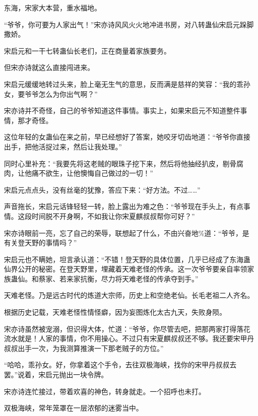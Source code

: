 
\begin{this_body}



东海，宋家大本营，重水福地。

“爷爷，你可要为人家出气！”宋亦诗风风火火地冲进书房，对八转蛊仙宋启元跺脚撒娇。

宋启元和一干七转蛊仙长老们，正在商量着家族要务。

但宋亦诗就这么直接闯进来。

宋启元缓缓地转过头来，脸上毫无生气的意思，反而满是慈祥的笑容：“我的乖孙女，要爷爷怎么为你出气啊？”

宋亦诗并不奇怪，自己的爷爷知道这件事情。事实上，如果宋启元不知道整件事情，那才奇怪。

这位年轻的女蛊仙在来之前，早已经想好了答案，她咬牙切齿地道：“爷爷你直接出手，把他活捉过来，然后让我处理。”

同时心里补充：“我要先将这老贼的眼珠子挖下来，然后将他抽经扒皮，剔骨腐肉，让他痛不欲生，让他懊悔自己做过的一切！”

宋启元点点头，没有丝毫的犹豫，答应下来：“好方法。不过……”

声音拖长，宋启元话锋轻轻一转，脸上露出为难之色：“爷爷现在手头上，有点事情。这段时间脱不开身啊，不如我让你宋夏麒叔叔帮你可好？”

宋亦诗眼前一亮，忘了自己的荣辱，联想起了什么，不由兴奋地\%道：“爷爷，是有关登天野的事情吗？”

宋启元也不瞒她，坦言承认道：“不错！登天野的具体位置，几乎已经成了东海蛊仙界公开的秘密。在登天野里，埋藏着天难老怪的传承。这一次爷爷要亲自率领家族蛊仙。和蔡家、若来家抗衡，尽力将天难老怪的传承夺到手。”

天难老怪。乃是远古时代的炼道大宗师，历史上和空绝老仙。长毛老祖二人齐名。

根据历史记载，天难老怪性情怪癖，因为妄图炼化太古九天，失败身陨。

宋亦诗虽然被宠溺，但识得大体，忙道：“爷爷，你尽管去吧，把那两家打得落花流水就是！人家的事情，你不用操心。不过只有宋夏麒叔叔还不够。我还要宋甲丹叔叔出手一次，为我测算推演一下那老贼子的方位。”

“哈哈，乖孙女。好，你拿着这个手令，去往双极海峡，找你的宋甲丹叔叔去罢。”说着，宋启元抛出一块令牌。

宋亦诗连忙接过，带着欢喜的神色，转身就走。一个招呼也未打。

双极海峡，常年笼罩在一层浓郁的迷雾当中。


\end{this_body}
